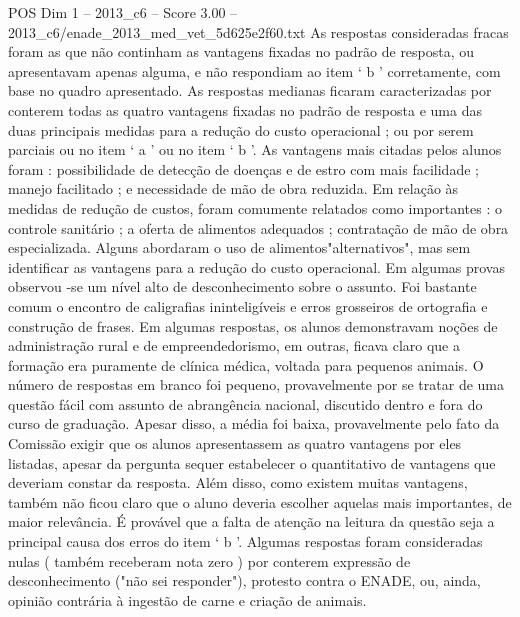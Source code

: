 \begin{textsample}{POS Dim 1 – 2013\_c6 – Score 3.00 – 2013\_c6/enade\_2013\_med\_vet\_5d625e2f60.txt}
As respostas consideradas fracas foram as que não continham as vantagens fixadas no padrão de resposta, ou apresentavam apenas alguma, e não respondiam ao item ‘ b ’ corretamente, com base no quadro apresentado.
As respostas medianas ficaram caracterizadas por conterem todas as quatro vantagens fixadas no padrão de resposta e uma das duas principais medidas para a redução do custo operacional ; ou por serem parciais ou no item ‘ a ’ ou no item ‘ b ’.
As vantagens mais citadas pelos alunos foram : possibilidade de detecção de doenças e de estro com mais facilidade ; manejo facilitado ; e necessidade de mão de obra reduzida.
Em relação às medidas de redução de custos, foram comumente relatados como importantes : o controle sanitário ; a oferta de alimentos adequados ; contratação de mão de obra especializada.
Alguns abordaram o uso de alimentos"alternativos", mas sem identificar as vantagens para a redução do custo operacional.
Em algumas provas observou -se um nível alto de desconhecimento sobre o assunto.
Foi bastante comum o encontro de caligrafias ininteligíveis e erros grosseiros de ortografia e construção de frases.
Em algumas respostas, os alunos demonstravam noções de administração rural e de empreendedorismo, em outras, ficava claro que a formação era puramente de clínica médica, voltada para pequenos animais.
O número de respostas em branco foi pequeno, provavelmente por se tratar de uma questão fácil com assunto de abrangência nacional, discutido dentro e fora do curso de graduação.
Apesar disso, a média foi baixa, provavelmente pelo fato da Comissão exigir que os alunos apresentassem as quatro vantagens por eles listadas, apesar da pergunta sequer estabelecer o quantitativo de vantagens que deveriam constar da resposta.
Além disso, como existem muitas vantagens, também não ficou claro que o aluno deveria escolher aquelas mais importantes, de maior relevância.
É provável que a falta de atenção na leitura da questão seja a principal causa dos erros do item ‘ b ’.
Algumas respostas foram consideradas nulas ( também receberam nota zero ) por conterem expressão de desconhecimento ("não sei responder"), protesto contra o ENADE, ou, ainda, opinião contrária à ingestão de carne e criação de animais.

\end{textsample}
